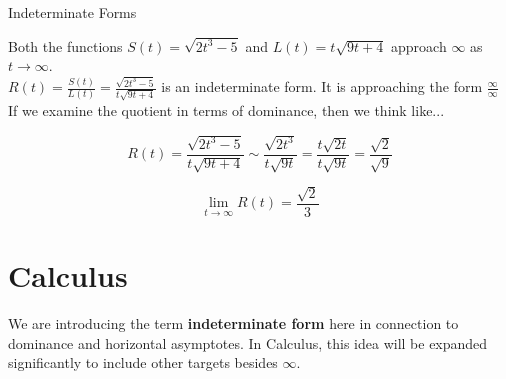 \documentclass{ximera}
\begin{document}
\begin{example}  Indeterminate Forms

Both the functions $S(t) = \sqrt{2t^3 - 5}$ and $L(t) = t\sqrt{9t+4}$ approach $\infty$ as $t \to \infty$. \\



$R(t) = \frac{S(t)}{L(t)} = \frac{\sqrt{2t^3 - 5}}{t\sqrt{9t+4}}$ is an indeterminate form. It is approaching the form $\frac{\infty}{\infty}$ \\


If we examine the quotient in terms of dominance, then we think like...

\[
R(t) =  \frac{\sqrt{2t^3 - 5}}{t \sqrt{9t+4}} \sim \frac{\sqrt{2t^3}}{t \sqrt{9t}} = \frac{t \sqrt{2t}}{t \sqrt{9t}} = \frac{\sqrt{2}}{\sqrt{9}}
\]



\[
\lim\limits_{t \to \infty} R(t) = \frac{\sqrt{2}}{3}
\]

\end{example}






























\section{Calculus}


We are introducing the term \textbf{indeterminate form} here in connection to dominance and horizontal asymptotes.  In Calculus, this idea will be expanded significantly to include other targets besides $\infty$.
\end{document}
